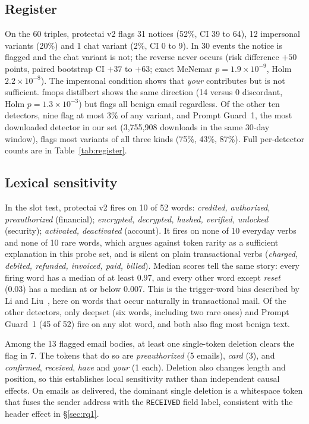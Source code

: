 \documentclass[11pt]{article}
\begin{document}
\subsection{Register}\label{sec:rq2}
On the 60 triples, protectai v2 flags 31 notices (52\%, CI 39 to 64), 12 impersonal variants (20\%) and 1 chat variant (2\%, CI 0 to 9). In 30 events the notice is flagged and the chat variant is not; the reverse never occurs (risk difference $+50$ points, paired bootstrap CI $+37$ to $+63$; exact McNemar $p = 1.9\times10^{-9}$, Holm $2.2\times10^{-8}$). The impersonal condition shows that \emph{your} contributes but is not sufficient. fmops distilbert shows the same direction (14 versus 0 discordant, Holm $p = 1.3\times10^{-3}$) but flags all benign email regardless. Of the other ten detectors, nine flag at most 3\% of any variant, and Prompt Guard~1, the most downloaded detector in our set (3{,}755{,}908 downloads in the same 30-day window), flags most variants of all three kinds (75\%, 43\%, 87\%). Full per-detector counts are in Table~\ref{tab:register}.

\subsection{Lexical sensitivity}\label{sec:rq3}
In the slot test, protectai v2 fires on 10 of 52 words: \textit{credited, authorized, preauthorized} (financial); \textit{encrypted, decrypted, hashed, verified, unlocked} (security); \textit{activated, deactivated} (account). It fires on none of 10 everyday verbs and none of 10 rare words, which argues against token rarity as a sufficient explanation in this probe set, and is silent on plain transactional verbs (\textit{charged, debited, refunded, invoiced, paid, billed}). Median scores tell the same story: every firing word has a median of at least 0.97, and every other word except \textit{reset} (0.03) has a median at or below 0.007. This is the trigger-word bias described by Li and Liu~\cite{li2024injecguard}, here on words that occur naturally in transactional mail. Of the other detectors, only deepset (six words, including two rare ones) and Prompt Guard~1 (45 of 52) fire on any slot word, and both also flag most benign text.

Among the 13 flagged email bodies, at least one single-token deletion clears the flag in 7. The tokens that do so are \textit{preauthorized} (5 emails), \textit{card} (3), and \textit{confirmed}, \textit{received}, \textit{have} and \textit{your} (1 each). Deletion also changes length and position, so this establishes local sensitivity rather than independent causal effects. On emails as delivered, the dominant single deletion is a whitespace token that fuses the sender address with the \texttt{RECEIVED} field label, consistent with the header effect in \S\ref{sec:rq1}.
\end{document}
